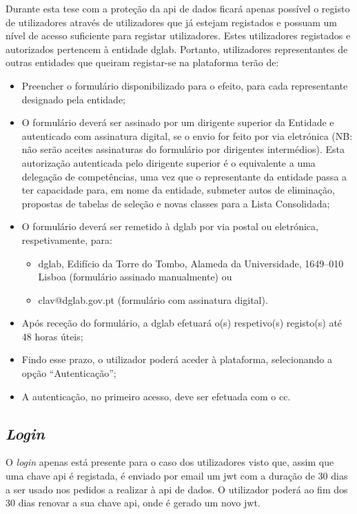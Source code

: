 Durante esta tese com a proteção da \acrshort{api} de dados ficará apenas possível o registo de utilizadores 
através de utilizadores que já estejam registados e possuam um nível de acesso suficiente para registar 
utilizadores. Estes utilizadores registados e autorizados pertencem à entidade \acrshort{dglab}. 
Portanto, utilizadores representantes de outras entidades que queiram registar-se na plataforma terão de:~\cite{clavwebpage}
\begin{itemize}
    \item Preencher o formulário disponibilizado para o efeito, para cada representante designado pela entidade;
    \item O formulário deverá ser assinado por um dirigente superior da Entidade e autenticado com assinatura digital, se o envio for feito por via eletrónica (NB\@: não serão aceites assinaturas do formulário por dirigentes intermédios). Esta autorização autenticada pelo dirigente superior é o equivalente a uma delegação de competências, uma vez que o representante da entidade passa a ter capacidade para, em nome da entidade, submeter autos de eliminação, propostas de tabelas de seleção e novas classes para a Lista Consolidada;
    \item O formulário deverá ser remetido à \acrshort{dglab} por via postal ou eletrónica, respetivamente, para:
    \begin{itemize}
        \item \acrshort{dglab}, Edifício da Torre do Tombo, Alameda da Universidade, 1649--010 Lisboa (formulário assinado manualmente) ou
        \item clav@dglab.gov.pt (formulário com assinatura digital).
    \end{itemize}
    \item Após receção do formulário, a \acrshort{dglab} efetuará o(s) respetivo(s) registo(s) até 48 horas úteis;
    \item Findo esse prazo, o utilizador poderá aceder à plataforma, selecionando a opção ``Autenticação'';
    \item A autenticação, no primeiro acesso, deve ser efetuada com o \acrlong{cc}.
\end{itemize}

\subsection{\textit{Login}}

O \textit{login} apenas está presente para o caso dos utilizadores visto que, assim que uma chave \acrshort{api} 
é registada, é enviado por email um \acrshort{jwt} com a duração de 30 dias a ser usado nos pedidos a realizar 
à \acrshort{api} de dados. O utilizador poderá ao fim dos 30 dias renovar a sua chave \acrshort{api}, onde é 
gerado um novo \acrshort{jwt}.

